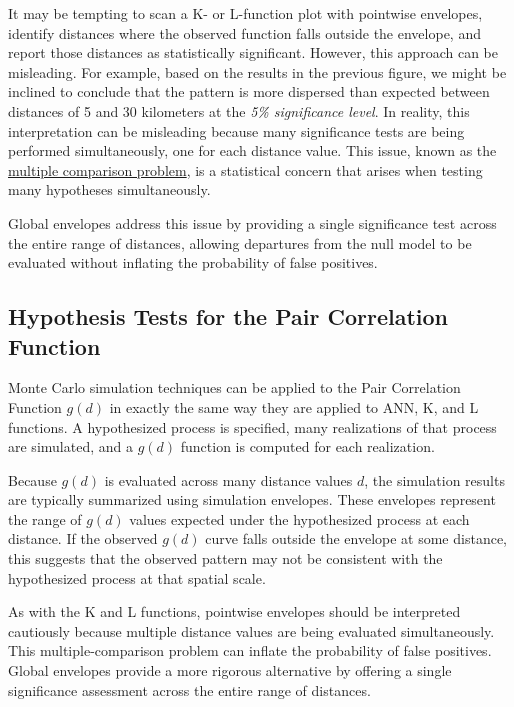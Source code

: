 \documentclass[
  letterpaper,
]{book}
\begin{document}
It may be tempting to scan a K- or L-function plot with pointwise
envelopes, identify distances where the observed function falls outside
the envelope, and report those distances as statistically significant.
However, this approach can be misleading. For example, based on the
results in the previous figure, we might be inclined to conclude that
the pattern is more dispersed than expected between distances of 5 and
30 kilometers at the \emph{5\% significance level}. In reality, this
interpretation can be misleading because many significance tests are
being performed simultaneously, one for each distance value. This issue,
known as the
\href{https://en.wikipedia.org/wiki/Multiple_comparisons_problem}{multiple
comparison problem}, is a statistical concern that arises when testing
many hypotheses simultaneously.

Global envelopes address this issue by providing a single significance
test across the entire range of distances, allowing departures from the
null model to be evaluated without inflating the probability of false
positives.

\subsection{Hypothesis Tests for the Pair Correlation
Function}\label{hypothesis-tests-for-the-pair-correlation-function}

Monte Carlo simulation techniques can be applied to the Pair Correlation
Function \(g(d)\) in exactly the same way they are applied to ANN, K,
and L functions. A hypothesized process is specified, many realizations
of that process are simulated, and a \(g(d)\) function is computed for
each realization.

Because \(g(d)\) is evaluated across many distance values \(d\), the
simulation results are typically summarized using simulation envelopes.
These envelopes represent the range of \(g(d)\) values expected under
the hypothesized process at each distance. If the observed \(g(d)\)
curve falls outside the envelope at some distance, this suggests that
the observed pattern may not be consistent with the hypothesized process
at that spatial scale.

As with the K and L functions, pointwise envelopes should be interpreted
cautiously because multiple distance values are being evaluated
simultaneously. This multiple-comparison problem can inflate the
probability of false positives. Global envelopes provide a more rigorous
alternative by offering a single significance assessment across the
entire range of distances.
\end{document}
